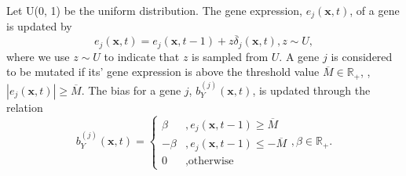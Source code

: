 \documentclass[\main/thesis.tex]{subfiles}
\begin{document}
Let U(0, 1) be the uniform distribution. The gene expression, $e_j(\boldsymbol{x}, t)$, of a gene is updated by
\begin{equation}
e_j(\boldsymbol{x}, t) {=} e_j(\boldsymbol{x}, t {-} 1) {+} z \overline{\delta}_j(\boldsymbol{x}, t),
z {\sim} U,
\label{eq:geneExprNN_geneExprUpdateFunc}
\end{equation}
where we use $z {\sim} U$ to indicate that $z$ is sampled from $U$.
A gene $j$ is considered to be mutated if its' gene expression 
is above the threshold value $\overline{M} {\in} \mathbb{R}_+$, \ie, $|e_j(\boldsymbol{x}, t)| {\ge} \overline{M}$. The bias for a gene $j$, $b_{Y}^{(j)}(\boldsymbol{x}, t)$, is updated 
through the relation
\begin{equation}
b_{Y}^{(j)}(\boldsymbol{x}, t) {=} \begin{cases}
                           \beta &, e_j(\boldsymbol{x}, t {-} 1) {\ge} \overline{M} \\
                        {-}\beta &, e_j(\boldsymbol{x}, t {-} 1) {\le} {-}\overline{M} \\
                               0 &, \text{otherwise}
                      \end{cases},
\beta {\in} \mathbb{R}_+.
\label{eq:geneExprNN_BiasVectorUpdateFunc}
\end{equation}
\end{document}

